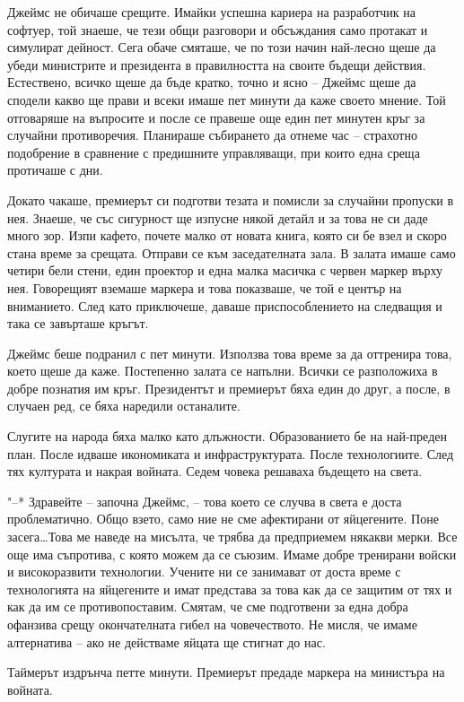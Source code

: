 \documentclass[ebook,openany,12pt]{memoir}
\begin{document}
Джеймс не обичаше срещите. Имайки успешна кариера на разработчик на софтуер, той знаеше, че тези общи разговори и обсъждания само протакат и симулират дейност. Сега обаче смяташе, че по този начин най-лесно щеше да убеди министрите и президента в правилността на своите бъдещи действия. Естествено, всичко щеше да бъде кратко, точно и ясно – Джеймс щеше да сподели какво ще прави и всеки имаше пет минути да каже своето мнение. Той отговаряше на въпросите и после се правеше още един пет минутен кръг за случайни противоречия. Планираше събирането да отнеме час – страхотно подобрение в сравнение с предишните управляващи, при които една среща протичаше с дни.

Докато чакаше, премиерът си подготви тезата и помисли за случайни пропуски в нея. Знаеше, че със сигурност ще изпусне някой детайл и за това не си даде много зор. Изпи кафето, почете малко от новата книга, която си бе взел и скоро стана време за срещата. Отправи се към заседателната зала. В залата имаше само четири бели стени, един проектор и една малка масичка с червен маркер върху нея. Говорещият вземаше маркера и това показваше, че той е център на вниманието. След като приключеше, даваше приспособлението на следващия и така се завърташе кръгът. 

Джеймс беше подранил с пет минути. Използва това време за да оттренира това, което щеше да каже. Постепенно залата се напълни. Всички се разположиха в добре познатия им кръг. Президентът и премиерът бяха един до друг, а после, в случаен ред, се бяха наредили останалите.

Слугите на народа бяха малко като длъжности. Образованието бе на най-преден план. После идваше икономиката и инфраструктурата. После технологиите. След тях културата и накрая войната. Седем човека решаваха бъдещето на света.

"--* Здравейте -- започна Джеймс, – това което се случва в света е доста проблематично. Общо взето, само ние не сме афектирани от яйцегените. Поне засега\ldots Това ме наведе на мисълта, че трябва да предприемем някакви мерки. Все още има съпротива, с която можем да се съюзим. Имаме добре тренирани войски и високоразвити технологии. Учените ни се занимават от доста време с технологията на яйцегените и имат представа за това как да се защитим от тях и как да им се противопоставим. Смятам, че сме подготвени за една добра офанзива срещу окончателната гибел на човечеството. Не мисля, че имаме алтернатива – ако не действаме яйцата ще стигнат до нас.

Таймерът издрънча петте минути. Премиерът предаде маркера на министъра на войната.
\end{document}
